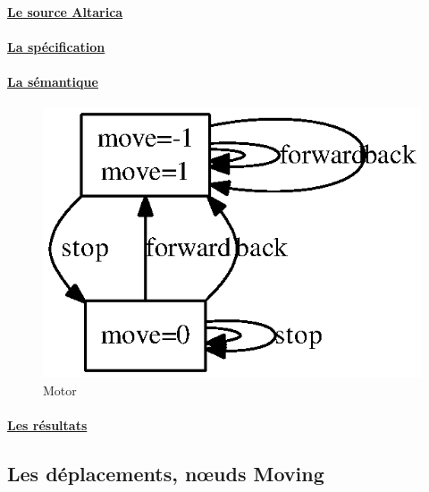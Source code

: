    \paragraph{\underline{Le source Altarica\\}}
    
    
    \paragraph{\underline{La spécification\\}}
    
    
    \paragraph{\underline{La sémantique\\}}
    \begin{figure}[!ht]
     \begin{center}
      \includegraphics{../src/altarica/Motor.eps}
      \caption{Motor}
     \end{center}
    \end{figure}

    \paragraph{\underline{Les résultats\\}}
    
    
   
  \subsection{Les déplacements, n\oe{uds Moving}}

